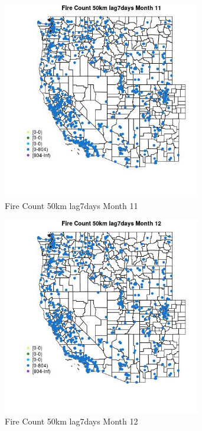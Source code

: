\begin{figure} 
\centering  
\includegraphics[width=0.77\textwidth]{Code_Outputs/Report_ML_input_PM25_Step4_part_f_de_duplicated_aveswNAs_MapObsMo11Fire_Count_50km_lag7days.jpg} 
\caption{\label{fig:Report_ML_input_PM25_Step4_part_f_de_duplicated_aveswNAsMapObsMo11Fire_Count_50km_lag7days}Fire Count 50km lag7days Month 11} 
\end{figure} 
 

\begin{figure} 
\centering  
\includegraphics[width=0.77\textwidth]{Code_Outputs/Report_ML_input_PM25_Step4_part_f_de_duplicated_aveswNAs_MapObsMo12Fire_Count_50km_lag7days.jpg} 
\caption{\label{fig:Report_ML_input_PM25_Step4_part_f_de_duplicated_aveswNAsMapObsMo12Fire_Count_50km_lag7days}Fire Count 50km lag7days Month 12} 
\end{figure} 
 

